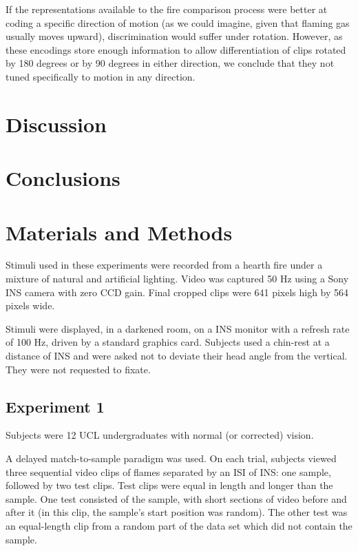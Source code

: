 \documentclass[a4paper]{article}
\begin{document}
If the representations available to the fire comparison process were better at coding a specific direction of motion (as we could imagine, given that flaming gas usually moves upward), discrimination would suffer under rotation. However, as these encodings store enough information to allow differentiation of clips rotated by 180 degrees or by 90 degrees in either direction, we conclude that they not tuned specifically to motion in any direction.


\section{Discussion}



\section{Conclusions}



\section{Materials and Methods}

Stimuli used in these experiments were recorded from a hearth fire under a mixture of natural and artificial lighting. Video was captured 50 Hz using a Sony INS camera with zero CCD gain. Final cropped clips were 641 pixels high by 564 pixels wide.

Stimuli were displayed, in a darkened room, on a INS monitor with a refresh rate of 100 Hz, driven by a standard graphics card. Subjects used a chin-rest at a distance of INS and were asked not to deviate their head angle from the vertical. They were not requested to fixate.

\subsection{Experiment 1}

Subjects were 12 UCL undergraduates with normal (or corrected) vision.

A delayed match-to-sample paradigm was used. On each trial, subjects viewed three sequential video clips of flames separated by an ISI of INS: one sample, followed by two test clips. Test clips were equal in length and longer than the sample. One test consisted of the sample, with short sections of video before and after it (in this clip, the sample's start position was random). The other test was an equal-length clip from a random part of the data set which did not contain the sample.
\end{document}

